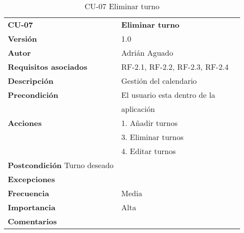 \begin{table}
\begin{tabular}{llr}  
\toprule
\begin{minipage}[b]{0.24\columnwidth}\raggedright\strut
\textbf{CU-07}\strut
\end{minipage} & \begin{minipage}[b]{0.72\columnwidth}\raggedright\strut
\textbf{ Eliminar turno}\strut
\end{minipage}\tabularnewline
\cmidrule(r){1-2}
\textbf{Versión}       & 1.0           \\
\textbf{Autor}       & Adrián  Aguado    \\
\textbf{Requisitos asociados}       & RF-2.1, RF-2.2, RF-2.3, RF-2.4  \\ 
\textbf{Descripción} & Gestión del calendario\\
\textbf{Precondición} & El usuario esta dentro de la \\
& aplicación       \\
\textbf{Acciones} & 1. Añadir turnos \\
& 3. Eliminar turnos \\
& 4. Editar turnos \\
\textbf{Postcondición} Turno deseado \\
\textbf{Excepciones} &     \\
\textbf{Frecuencia} & Media          \\
\textbf{Importancia} & Alta            \\
\textbf{Comentarios } &      \\
\bottomrule
\end{tabular}
\caption{CU-07 Eliminar turno} 
\end{table}


